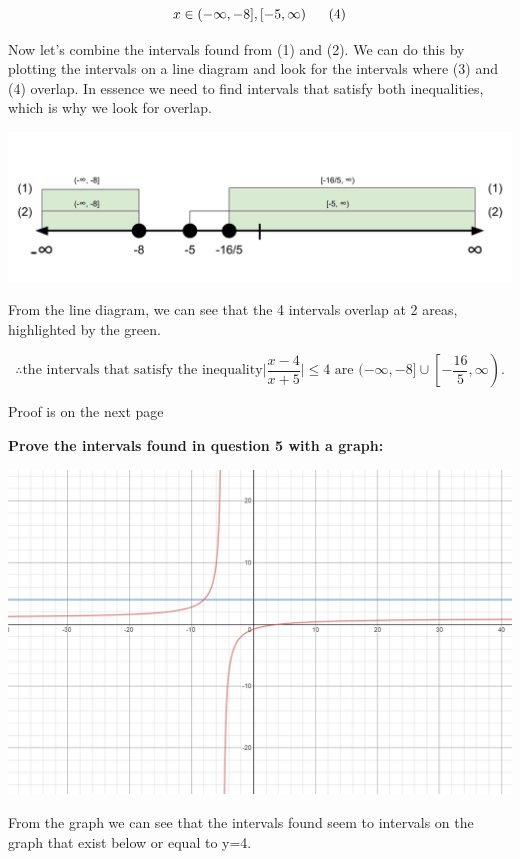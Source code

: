 \documentclass[12pt]{book}
\begin{document}
\begin{enumerate}
$$x \in (-\infty, -8], [-5, \infty) \text{\space\space\space\space\space} (4)$$
\vspace{0.1cm}

Now let's combine the intervals found from (1) and (2). We can do this by 
plotting the intervals on a line diagram and look for the intervals where
(3) and (4) overlap. In essence we need to find intervals that satisfy both 
inequalities, which is why we look for overlap.

\includegraphics[width=\linewidth]{A2-5 Line Diagram (1).png}

From the line diagram, we can see that the 4 intervals overlap at 2 areas,
 highlighted by the green.
 
$$\boxed{\therefore \text{the intervals that satisfy the inequality} \bigg|\dfrac{x-4}{x+5}\bigg| \le 4 \text{ are } (-\infty , -8] \cup \left[ -\dfrac{16}{5}, \infty \right) \text{.}}$$

\vspace{2cm}
\begin{center}
    Proof is on the next page
\end{center}

\newpage

\textbf{Prove the intervals found in question 5 with a graph:}

\begin{center}
\includegraphics[scale = 0.7]{A2-5 Proof.PNG}
\end{center}

\vspace{0.5cm}
From the graph we can see that the intervals found seem to intervals
 on the graph that exist below or equal to y=4.

\newpage

\end{enumerate}
\end{document}
